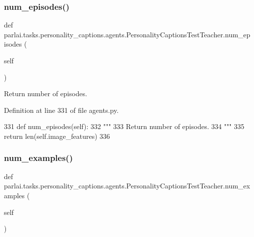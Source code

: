 \subsubsection{\texorpdfstring{num\+\_\+episodes()}{num\_episodes()}}
{\footnotesize\ttfamily def parlai.\+tasks.\+personality\+\_\+captions.\+agents.\+Personality\+Captions\+Test\+Teacher.\+num\+\_\+episodes (\begin{DoxyParamCaption}\item[{}]{self }\end{DoxyParamCaption})}

\begin{DoxyVerb}Return number of episodes.
\end{DoxyVerb}
 

Definition at line 331 of file agents.\+py.


\begin{DoxyCode}
331     \textcolor{keyword}{def }num\_episodes(self):
332         \textcolor{stringliteral}{"""}
333 \textcolor{stringliteral}{        Return number of episodes.}
334 \textcolor{stringliteral}{        """}
335         \textcolor{keywordflow}{return} len(self.image\_features)
336 
\end{DoxyCode}
\mbox{\label{classparlai_1_1tasks_1_1personality__captions_1_1agents_1_1PersonalityCaptionsTestTeacher_aa3c10b49dc8d2510f8d28846194ac2a6}} 
\subsubsection{\texorpdfstring{num\+\_\+examples()}{num\_examples()}}
{\footnotesize\ttfamily def parlai.\+tasks.\+personality\+\_\+captions.\+agents.\+Personality\+Captions\+Test\+Teacher.\+num\+\_\+examples (\begin{DoxyParamCaption}\item[{}]{self }\end{DoxyParamCaption})}

